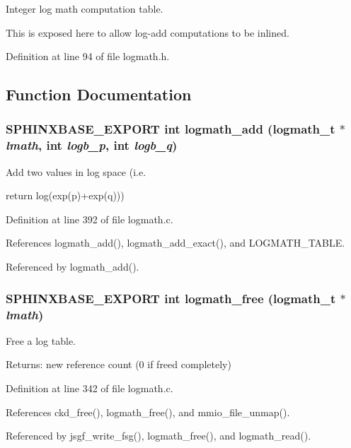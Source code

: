 Integer log math computation table. 

This is exposed here to allow log-add computations to be inlined. 

Definition at line 94 of file logmath.h.

\subsection{Function Documentation}
\subsubsection[{logmath\_\-add}]{\setlength{\rightskip}{0pt plus 5cm}SPHINXBASE\_\-EXPORT int logmath\_\-add ({\bf logmath\_\-t} $\ast$ {\em lmath}, \/  int {\em logb\_\-p}, \/  int {\em logb\_\-q})}\label{logmath_8h_5eb70928578b0115c9c7ac2765396a06}


Add two values in log space (i.e. 

return log(exp(p)+exp(q))) 

Definition at line 392 of file logmath.c.

References logmath\_\-add(), logmath\_\-add\_\-exact(), and LOGMATH\_\-TABLE.

Referenced by logmath\_\-add().
\subsubsection[{logmath\_\-free}]{\setlength{\rightskip}{0pt plus 5cm}SPHINXBASE\_\-EXPORT int logmath\_\-free ({\bf logmath\_\-t} $\ast$ {\em lmath})}\label{logmath_8h_97865ef8bc1e8e2525a2329e0627ecfb}


Free a log table. 

\begin{Desc}
\item[Returns:]new reference count (0 if freed completely) \end{Desc}


Definition at line 342 of file logmath.c.

References ckd\_\-free(), logmath\_\-free(), and mmio\_\-file\_\-unmap().

Referenced by jsgf\_\-write\_\-fsg(), logmath\_\-free(), and logmath\_\-read().

